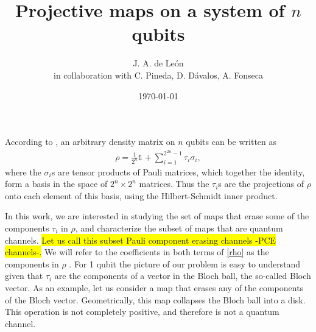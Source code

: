 \documentclass[11pt,dvipsnames]{article} %
\newcommand{\pce}{PCE}
\newcommand{\h}[1]{\colorbox{Yellow}{#1}}
\newcommand{\1}{\mathds{1}}
\begin{document}
\title{Projective maps on a system of $n$ qubits} 
\author{J. A. de León\\ \small{in collaboration with C. Pineda, D. Dávalos, A. Fonseca}}


\date{\today}  

\maketitle
According to \cite{bengtsson_zyczkowski_2017}, an arbitrary density matrix on $n$  
qubits can be written as
\begin{align}
  \rho = \frac{1}{2^n}\1 + \sum _{i=1}^{2^{2n}-1}\tau _i\sigma _i,
	\label{rho}
\end{align}
where the $\sigma _i$s are tensor products of Pauli 
matrices, which together the identity, form a basis in the space of $2^n\times 2^n$ matrices. Thus the 
$\tau_i$s are the projections of $\rho$ onto each element of this basis, using the Hilbert-Schmidt inner product.



In this work, we are interested in studying the set of maps that erase
some of the components $\tau_i$ in $\rho$, and characterize the subset of maps
that are quantum channels.
\h{Let us call this subset Pauli component erasing
channels -\pce{} channels-.}
We will refer to the coefficients in both terms of 
\eqref{rho} as the components in $\rho$ . 
For 1 qubit the picture of our problem is easy to understand given that 
$\tau_i$ are the components of a vector in the Bloch ball, the so-called
Bloch vector. As an example, let us consider a map that erases any of the 
components of the Bloch vector. Geometrically, this map collapses 
the Bloch ball into a disk. This operation is not completely positive, and therefore is not a quantum channel.  

\end{document}

